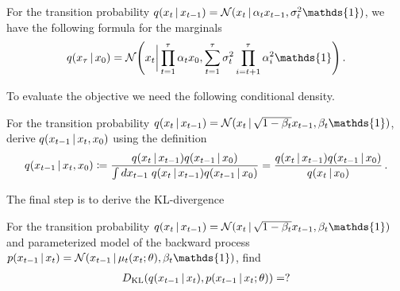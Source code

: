 \begin{proposition}
    For the transition probability $q(x_t\cond x_{t-1}) = \Normal(x_t\cond \alpha_t x_{t-1}, \sigma_t^2 \mathds{1})$, we have the following formula for the marginals
    \begin{align}
        q(x_\tau\cond x_{0}) = \Normal\left(x_t\bigg| \prod_{t=1}^\tau\alpha_t x_{0}, \sum_{t=1}^\tau \sigma_t^2 \prod_{i=t+1}^\tau\alpha_i^2\mathds{1}\right)\,.
    \end{align}
\end{proposition}
To evaluate the objective we need the following conditional density.
\begin{exercise}
    For the transition probability $q(x_t\cond x_{t-1}) = \Normal(x_t\cond \sqrt{1-\beta_t} x_{t-1}, \beta_t \mathds{1})$, derive $q(x_{t-1}\,|\, x_{t}, x_0)$ using the definition
    \begin{align}
    q(x_{t-1}\,|\, x_{t}, x_0) \coloneqq \frac{q(x_{t}\,|\, x_{t-1})q(x_{t-1}\,|\, x_0)}{\int dx_{t-1}\;q(x_{t}\,|\, x_{t-1})q(x_{t-1}\,|\, x_0)} = \frac{q(x_{t}\,|\, x_{t-1})q(x_{t-1}\,|\, x_0)}{q(x_t\,|\, x_0)}\,.
    \end{align}
\end{exercise}
The final step is to derive the KL-divergence
\begin{exercise}
    For the transition probability $q(x_t\cond x_{t-1}) = \Normal(x_t\cond \sqrt{1-\beta_t} x_{t-1}, \beta_t \mathds{1})$ and parameterized model of the backward process $p(x_{t-1}\cond x_{t}) = \Normal(x_{t-1}\cond \mu_t(x_t;\theta), \beta_t \mathds{1})$, find
    \begin{align}
        D_{\mathrm{KL}}(q(x_{t-1}\,|\, x_{t}),p(x_{t-1}\,|\, x_t;\theta)) = ?
    \end{align}
\end{exercise}